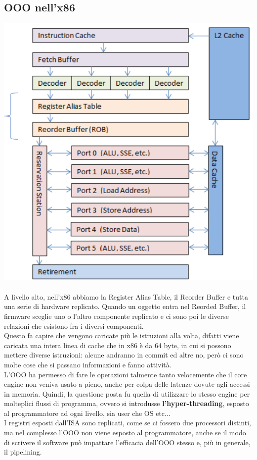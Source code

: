 \documentclass[12pt, oneside]{extbook}
\begin{document}
\subsection{OOO nell'x86}
\includegraphics[scale=0.3]{immagini/x86-ooo}\\\\
A livello alto, nell'x86 abbiamo la Register Alias Table, il Reorder Buffer e tutta una serie di hardware replicato. Quando un oggetto entra nel Reorded Buffer, il firmware sceglie uno o l'altro componente replicato e ci sono poi le diverse relazioni che esistono fra i diversi componenti.\\ Questo fa capire che vengono caricate più le istruzioni alla volta, difatti viene caricata una intera linea di cache che in x86 è da 64 byte, in cui si possono mettere diverse istruzioni: alcune andranno in commit ed altre no, però ci sono molte cose che si passano informazioni e fanno attività.\\ L'OOO ha permesso di fare le operazioni talmente tanto velocemente che il core engine non veniva usato a pieno, anche per colpa delle latenze dovute agli accessi in memoria. Quindi, la questione posta fu quella di utilizzare lo stesso engine per molteplici flussi di programma, ovvero si introdusse \textbf{l'hyper-threading}, esposto al programmatore ad ogni livello, sia user che OS etc...\\ I registri esposti dall'ISA sono replicati, come se ci fossero due processori distinti, ma nel complesso l'OOO non viene esposto al programmatore, anche se il modo di scrivere il software può impattare l'efficacia dell'OOO stesso e, più in generale, il pipelining.
\end{document}
